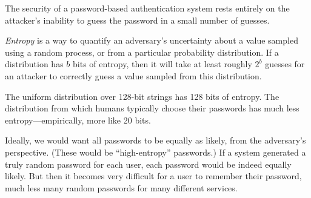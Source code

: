 
The security of a password-based authentication system
rests entirely on the attacker's inability to guess the password
in a small number of guesses.

\emph{Entropy} is a way to quantify an adversary's
uncertainty about a value sampled using a random
process, or from a particular probability distribution.
If a distribution has $b$ bits of entropy, then
it will take at least roughly $2^b$ guesses 
for an attacker to correctly
guess a value sampled from this distribution.

The uniform distribution over 128-bit strings has 128 bits of entropy.
The distribution from which humans typically choose their passwords
has much less entropy---empirically, more like 20 bits.

Ideally, we would want all passwords to be equally as likely,
from the adversary's perspective.
(These would be ``high-entropy'' passwords.)
If a system generated a truly random password for each user,
each password would be indeed equally likely.
But then it becomes very difficult for a user to remember their 
password, much less many random passwords for many different services.

